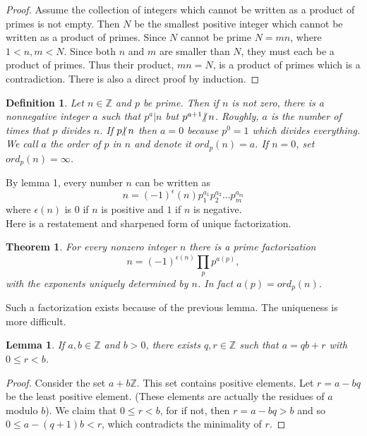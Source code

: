 \documentclass{article}
\theoremstyle{problemstyle}
\newtheorem{theorem}{Theorem}
\newtheorem{lemma}{Lemma}
\newtheorem{definition}{Definition}
\newcommand{\ndiv}{\hspace{-4pt}\not|\hspace{2pt}}
\begin{document}
\begin{proof}
Assume the collection of integers which cannot be written as a product of primes is not empty. Then $N$ be the smallest positive integer which cannot be written as a product of primes. Since $N$ cannot be prime $N = mn$, where $1<n,m<N$. Since both $n$ and $m$ are smaller than $N$, they must each be a product of primes. Thus their product, $mn = N$, is a product of primes which is a contradiction.  There is also a direct proof by induction. 
\end{proof}

\begin{definition}
Let $n \in \mathbb{Z}$ and $p$ be prime. Then if $n$ is not zero, there is a nonnegative integer $a$ such that $p^a|n$ but $p^{a+1}\ndiv n$. Roughly, $a$ is the number of times that $p$ divides $n$. If $p\ndiv n$ then $a = 0$ because $p^0 = 1$ which divides everything. We call $a$ the order of $p$ in $n$ and denote it $ord_p(n) = a$. If $n = 0$, set $ord_p(n) = \infty$. 
\end{definition}

By lemma 1, every number $n$ can be written as $$n = (-1)^\epsilon(n) p_1^{a_1}p_2^{a_2}...p_m^{a_m}$$ where $\epsilon(n)$ is $0$ if $n$ is positive and $1$ if $n$ is negative.\\

Here is a restatement and sharpened form of unique factorization. 

\begin{theorem}
For every nonzero integer $n$ there is a prime factorization 
\begin{equation*}n = (-1)^{\epsilon(n)}\prod_pp^{a(p)}, \end{equation*} 
with the exponents uniquely determined by $n$. In fact $a(p) = ord_p(n)$. 
\end{theorem}

Such a factorization exists because of the previous lemma. The uniqueness is more difficult. 

\begin{lemma}
If $a,b \in \mathbb{Z}$ and $b > 0$, there exists $q,r \in \mathbb{Z}$ such that $a = qb+r$ with $0 \leq r < b$. 
\end{lemma}

\begin{proof}
Consider the set $a+b\mathbb{Z}$. This set contains positive elements. Let $r = a - bq$ be the least positive element. (These elements are actually the residues of $a$ modulo $b$). We claim that $0 \leq r < b$, for if not, then $r = a-bq > b$ and so $0 \leq a-(q+1)b < r$, which contradicts the minimality of $r$. 
\end{proof}
\end{document}
